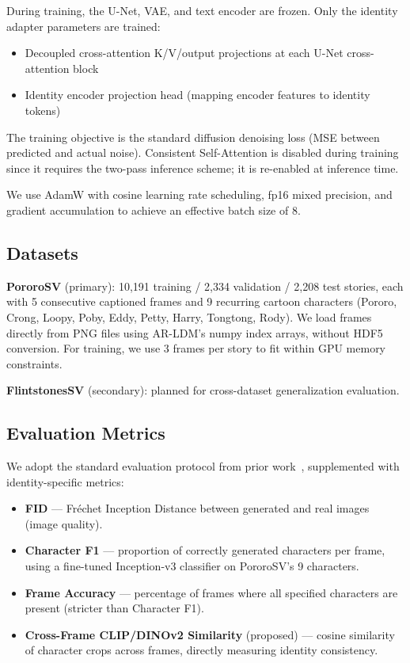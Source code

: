 \documentclass[11pt]{article}
\begin{document}
During training, the U-Net, VAE, and text encoder are frozen. Only the identity adapter parameters are trained:
\begin{itemize}[leftmargin=*]
    \item Decoupled cross-attention K/V/output projections at each U-Net cross-attention block
    \item Identity encoder projection head (mapping encoder features to identity tokens)
\end{itemize}

The training objective is the standard diffusion denoising loss (MSE between predicted and actual noise). Consistent Self-Attention is disabled during training since it requires the two-pass inference scheme; it is re-enabled at inference time.

We use AdamW with cosine learning rate scheduling, fp16 mixed precision, and gradient accumulation to achieve an effective batch size of 8.

\subsection{Datasets}

\textbf{PororoSV} (primary): 10,191 training / 2,334 validation / 2,208 test stories, each with 5 consecutive captioned frames and 9 recurring cartoon characters (Pororo, Crong, Loopy, Poby, Eddy, Petty, Harry, Tongtong, Rody). We load frames directly from PNG files using AR-LDM's numpy index arrays, without HDF5 conversion. For training, we use 3 frames per story to fit within GPU memory constraints.

\textbf{FlintstonesSV} (secondary): planned for cross-dataset generalization evaluation.

\subsection{Evaluation Metrics}

We adopt the standard evaluation protocol from prior work~\cite{maharana2021vlcstorygan}, supplemented with identity-specific metrics:

\begin{itemize}[leftmargin=*]
    \item \textbf{FID} --- Fr\'{e}chet Inception Distance between generated and real images (image quality).
    \item \textbf{Character F1} --- proportion of correctly generated characters per frame, using a fine-tuned Inception-v3 classifier on PororoSV's 9 characters.
    \item \textbf{Frame Accuracy} --- percentage of frames where all specified characters are present (stricter than Character F1).
    \item \textbf{Cross-Frame CLIP/DINOv2 Similarity} (proposed) --- cosine similarity of character crops across frames, directly measuring identity consistency.
\end{itemize}
\end{document}
